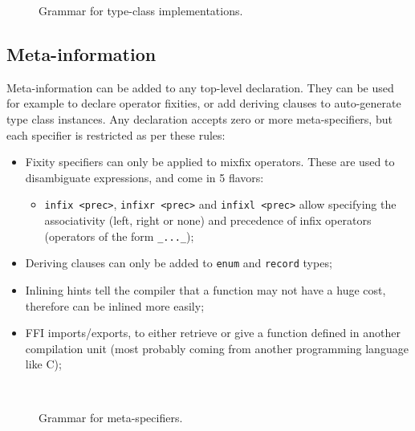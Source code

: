 \noindent\inputminted{\zilchlexer}{examples/impl-record-equivalent.zc}

\begin{figure}[H]
	\centering


	\caption{Grammar for type-class implementations.}
	\label{fig:zilch-grammar-declarations-implementation-grammar}
\end{figure}

\subsection{Meta-information}\label{subsec:zilch-grammar-declarations-meta}

Meta-information can be added to any top-level declaration.
They can be used for example to declare operator fixities, or add deriving clauses to auto-generate type class instances.
Any declaration accepts zero or more meta-specifiers, but each specifier is restricted as per these rules:
\begin{itemize}
	\item Fixity specifiers can only be applied to mixfix operators.
	      These are used to disambiguate expressions, and come in 5 flavors:
	      \begin{itemize}
		      \item \verb|infix <prec>|, \verb|infixr <prec>| and \verb|infixl <prec>| allow specifying the associativity (left, right or none) and precedence of infix operators (operators of the form \verb|_..._|);
	      \end{itemize}
	\item Deriving clauses can only be added to \verb|enum| and \verb|record| types;
	\item Inlining hints tell the compiler that a function may not have a huge cost, therefore can be inlined more easily;
	\item FFI imports/exports, to either retrieve or give a function defined in another compilation unit (most probably coming from another programming language like C);
\end{itemize}

\begin{figure}[H]
	\centering

	\\

	\caption{Grammar for meta-specifiers.}
	\label{fig:zilch-grammar-declarations-meta-grammar}
\end{figure}

